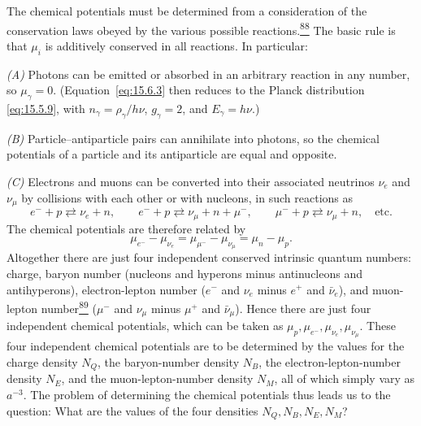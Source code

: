 The chemical potentials must be determined from a consideration of the
conservation laws obeyed by the various possible
reactions.\hyperref[ch15-ref-88]{\textsuperscript{88}} The basic rule is that
\(\mu_i\) is additively conserved in all reactions. In particular:

\emph{(A)} Photons can be emitted or absorbed in an arbitrary reaction in any
number, so \(\mu_\gamma=0\). (Equation~\eqref{eq:15.6.3} then reduces to the
Planck distribution \eqref{eq:15.5.9}, with
\(n_\gamma=\rho_\gamma/h\nu\), \(g_\gamma=2\), and \(E_\gamma=h\nu\).)

\emph{(B)} Particle--antiparticle pairs can annihilate into photons, so the
chemical potentials of a particle and its antiparticle are equal and opposite.

\emph{(C)} Electrons and muons can be converted into their associated
neutrinos \(\nu_e\) and \(\nu_\mu\) by collisions with each other or with
nucleons, in such reactions as
\[
  e^-+p\rightleftarrows\nu_e+n,
  \qquad
  e^-+p\rightleftarrows\nu_\mu+n+\mu^-,
  \qquad
  \mu^-+p\rightleftarrows\nu_\mu+n,
  \quad\text{etc.}
\]
The chemical potentials are therefore related by
\begin{equation}
  \mu_{e^-}-\mu_{\nu_e}
  =
  \mu_{\mu^-}-\mu_{\nu_\mu}
  =
  \mu_n-\mu_p.
  \tag{15.6.4}\label{eq:15.6.4}
\end{equation}
Altogether there are just four independent conserved intrinsic quantum
numbers: charge, baryon number (nucleons and hyperons minus antinucleons and
antihyperons), electron-lepton number (\(e^-\) and \(\nu_e\) minus \(e^+\)
and \(\bar\nu_e\)), and muon-lepton
number\hyperref[ch15-ref-89]{\textsuperscript{89}} (\(\mu^-\) and \(\nu_\mu\)
minus \(\mu^+\) and \(\bar\nu_\mu\)). Hence there are just four independent
chemical potentials, which can be taken as
\(\mu_p,\mu_{e^-},\mu_{\nu_e},\mu_{\nu_\mu}\). These four independent chemical
potentials are to be determined by the values for the charge density \(N_Q\),
the baryon-number density \(N_B\), the electron-lepton-number density \(N_E\),
and the muon-lepton-number density \(N_M\), all of which simply vary as
\(a^{-3}\). The problem of determining the chemical potentials thus leads us
to the question: What are the values of the four densities
\(N_Q,N_B,N_E,N_M\)?

